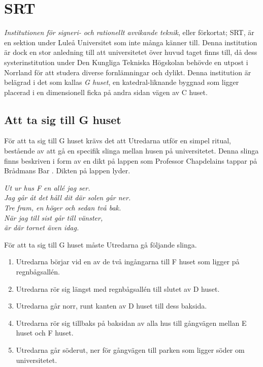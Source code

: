 \section{SRT}
\label{loc:SRT}
\textit{Institutionen för signeri- och rationellt avvikande teknik}, eller förkortat; SRT, är en sektion under Luleå Universitet som inte många känner till. Denna institution är dock en stor anledning till att universitetet över huvud taget finns till, då dess systerinstitution under Den Kungliga Tekniska Högskolan behövde en utpost i Norrland för att studera diverse fornlämningar och dylikt. Denna institution är belägrad i det som kallas \textit{G huset}, en katedral-liknande byggnad som ligger placerad i en dimensionell ficka på andra sidan vägen av C huset.
%
\subsection{Att ta sig till G huset}
\label{uppd:TaSigTillG}
För att ta sig till G huset krävs det att Utredarna utför en simpel ritual, bestående av att gå en specifik slinga mellan husen på universitetet. Denna slinga finns beskriven i form av en dikt på lappen som Professor Chapdelains tappar på Brådmans Bar \sectiondescribe{\ref{loc:BradmansBar}}. Dikten på lappen lyder.
%
\begin{displayquote}
\begin{center}
	\textit{Ut ur hus F en allé jag ser. \\
	Jag går åt det håll dit där solen går ner. \\
	\vspace*{10px}
	Tre fram, en höger och sedan två bak. \\
	När jag till sist går till vänster, \\
	är där tornet även idag.}
\end{center}
\end{displayquote}
%
För att ta sig till G huset måste Utredarna gå följande slinga.
%
\begin{enumerate}
	\item Utredarna börjar vid en av de två ingångarna till F huset som ligger på regnbågsallén.
	\item Utredarna rör sig längst med regnbågsallén till slutet av D huset.
	\item Utredarna går norr, runt kanten av D huset till dess baksida.
	\item Utredarna rör sig tillbaks på baksidan av alla hus till gångvägen mellan E huset och F huset.
	\item Utredarna går söderut, ner för gångvägen till parken som ligger söder om universitetet. 
\end{enumerate}
%
